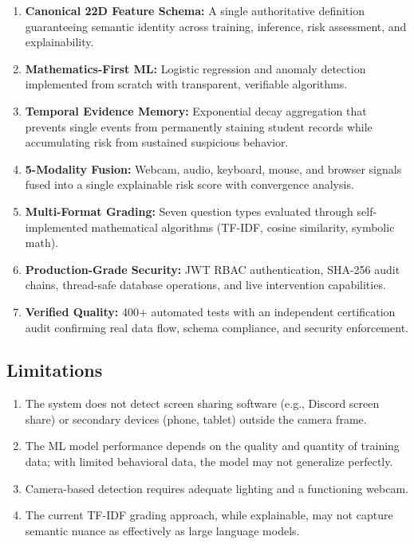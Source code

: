 \documentclass{article}
\begin{document}
\begin{enumerate}
    \item \textbf{Canonical 22D Feature Schema:} A single authoritative definition guaranteeing semantic identity across training, inference, risk assessment, and explainability.

    \item \textbf{Mathematics-First ML:} Logistic regression and anomaly detection implemented from scratch with transparent, verifiable algorithms.

    \item \textbf{Temporal Evidence Memory:} Exponential decay aggregation that prevents single events from permanently staining student records while accumulating risk from sustained suspicious behavior.

    \item \textbf{5-Modality Fusion:} Webcam, audio, keyboard, mouse, and browser signals fused into a single explainable risk score with convergence analysis.

    \item \textbf{Multi-Format Grading:} Seven question types evaluated through self-implemented mathematical algorithms (TF-IDF, cosine similarity, symbolic math).

    \item \textbf{Production-Grade Security:} JWT RBAC authentication, SHA-256 audit chains, thread-safe database operations, and live intervention capabilities.

    \item \textbf{Verified Quality:} 400+ automated tests with an independent certification audit confirming real data flow, schema compliance, and security enforcement.
\end{enumerate}

\subsection{Limitations}

\begin{enumerate}
    \item The system does not detect screen sharing software (e.g., Discord screen share) or secondary devices (phone, tablet) outside the camera frame.
    \item The ML model performance depends on the quality and quantity of training data; with limited behavioral data, the model may not generalize perfectly.
    \item Camera-based detection requires adequate lighting and a functioning webcam.
    \item The current TF-IDF grading approach, while explainable, may not capture semantic nuance as effectively as large language models.
\end{enumerate}
\end{document}
